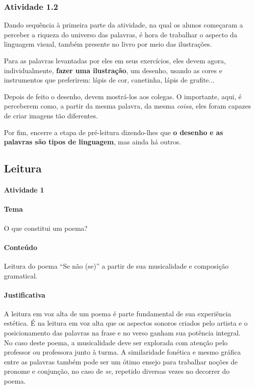 \documentclass[11pt]{extarticle}
\begin{document}
\subsubsection{Atividade 1.2}

Dando sequência à primeira parte da atividade, na qual os alunos
começaram a perceber a riqueza do universo das palavras, 
é hora de trabalhar o aspecto da linguagem visual, também 
presente no livro por meio das ilustrações. 

Para as palavras levantadas por eles em seus exercícios,
eles devem agora, individualmente, \textbf{fazer uma ilustração},
um desenho, usando as cores e instrumentos que preferirem: lápis de cor, 
canetinha, lápis de grafite... 

Depois de feito o desenho, devem mostrá-los aos colegas.
O importante, aqui, é perceberem como, a partir da mesma 
palavra, da mesma \textit{coisa}, eles foram capazes de criar 
imagens tão diferentes. 

Por fim, encerre a etapa de pré-leitura dizendo-lhes
que \textbf{o desenho e as palavras são tipos de linguagem},
mas ainda há outros.



\subsection{Leitura}


\paragraph{Atividade 1}

\paragraph{Tema} O que constitui um poema?

\paragraph{Conteúdo} Leitura do poema ``Se não (se)'' a partir de sua musicalidade e 
composição gramatical.

\paragraph{Justificativa} A leitura em voz alta de um poema é 
parte fundamental de sua experiência estética. 
É na leitura em voz alta que os aspectos sonoros
criados pelo artista e o posicionamento das
palavras na frase e no verso ganham sua potência integral. 
No caso deste poema, a musicalidade deve ser explorada com atenção pelo professor ou professora 
junto à turma. 
A similaridade fonética e mesmo gráfica entre 
as palavras também pode ser um ótimo ensejo
para trabalhar noções de pronome e conjunção, no caso 
de \textit{se}, repetido diversas vezes no 
decorrer do poema.
\end{document}

